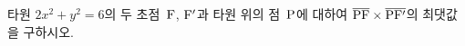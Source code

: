타원 $2x^2+y^2=6$의 두 초점~$\mathrm{F}$, $\mathrm{F}'$과 타원 위의 점~$\mathrm{P}$에 대하여 $\overline{\mathrm{PF}}\times\overline{\mathrm{PF'}}$의 최댓값을 구하시오.
